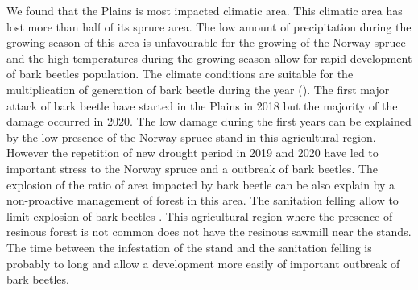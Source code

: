 \documentclass[3p,procedia]{elsarticle}
\begin{document}
We found that the Plains is most impacted climatic area.
This climatic area has lost more than half of its spruce area.
The low amount of precipitation during the growing season of this area is unfavourable for the growing of the Norway spruce and the high temperatures during the growing season allow for rapid development of bark beetles population.
The climate conditions are suitable for the multiplication of generation of bark beetle during the year (\citep{annila_influence_1969,baier_phenipscomprehensive_2007}).
The first major attack of bark beetle have started in the Plains in 2018 but the majority of the damage occurred in 2020. 
The low damage during the first years can be explained by the low presence of the Norway spruce stand in this agricultural region.
However the repetition of new drought period in 2019 and 2020 have led to important stress to the Norway spruce and a outbreak of bark beetles. 
The explosion of the ratio of area impacted by bark beetle can be also explain by a non-proactive management of forest in this area.
The sanitation felling allow to limit explosion of bark beetles \citep{stadelmann_effects_2013}.
This agricultural region where the presence of resinous forest is not common does not have the resinous sawmill near the stands.  
The time between the infestation of the stand and the sanitation felling is probably to long and allow a development more easily of important outbreak of bark beetles.
\end{document}
